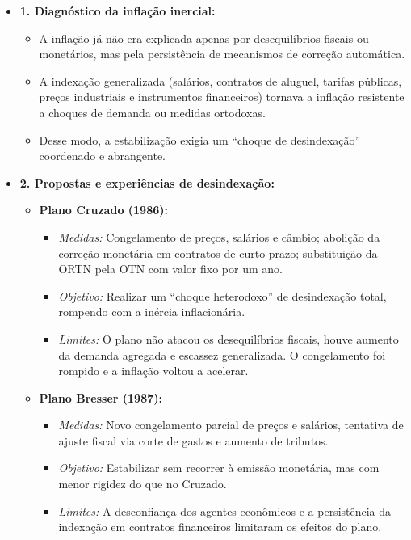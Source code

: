 \documentclass[a4paper,12pt]{article}[abntex2]
\begin{document}
\begin{itemize}
    \item \textbf{1. Diagnóstico da inflação inercial:}
    \begin{itemize}
        \item A inflação já não era explicada apenas por desequilíbrios fiscais ou monetários, mas pela persistência de mecanismos de correção automática.
        \item A indexação generalizada (salários, contratos de aluguel, tarifas públicas, preços industriais e instrumentos financeiros) tornava a inflação resistente a choques de demanda ou medidas ortodoxas.
        \item Desse modo, a estabilização exigia um “choque de desindexação” coordenado e abrangente.
    \end{itemize}

    \item \textbf{2. Propostas e experiências de desindexação:}

    \begin{itemize}
        \item \textbf{Plano Cruzado (1986):}
        \begin{itemize}
            \item \textit{Medidas:} Congelamento de preços, salários e câmbio; abolição da correção monetária em contratos de curto prazo; substituição da ORTN pela OTN com valor fixo por um ano.
            \item \textit{Objetivo:} Realizar um “choque heterodoxo” de desindexação total, rompendo com a inércia inflacionária.
            \item \textit{Limites:} O plano não atacou os desequilíbrios fiscais, houve aumento da demanda agregada e escassez generalizada. O congelamento foi rompido e a inflação voltou a acelerar.
        \end{itemize}

        \item \textbf{Plano Bresser (1987):}
        \begin{itemize}
            \item \textit{Medidas:} Novo congelamento parcial de preços e salários, tentativa de ajuste fiscal via corte de gastos e aumento de tributos.
            \item \textit{Objetivo:} Estabilizar sem recorrer à emissão monetária, mas com menor rigidez do que no Cruzado.
            \item \textit{Limites:} A desconfiança dos agentes econômicos e a persistência da indexação em contratos financeiros limitaram os efeitos do plano.
        \end{itemize}


\end{itemize}
\end{itemize}
\end{document}
